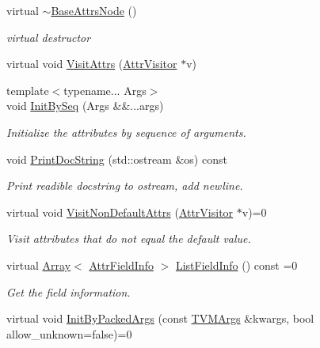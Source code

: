 \begin{DoxyCompactItemize}
\item 
virtual \hyperlink{classtvm_1_1BaseAttrsNode_a225581a40231b2de219da30fced428a2}{$\sim$\+Base\+Attrs\+Node} ()
\begin{DoxyCompactList}\small\item\em virtual destructor \end{DoxyCompactList}\item 
virtual void \hyperlink{classtvm_1_1BaseAttrsNode_af145cd54a0d92705871500a675e43abe}{Visit\+Attrs} (\hyperlink{classtvm_1_1AttrVisitor}{Attr\+Visitor} $\ast$v)
\item 
{\footnotesize template$<$typename... Args$>$ }\\void \hyperlink{classtvm_1_1BaseAttrsNode_aef9e5266d16e163ccc7b1b16c1ea3269}{Init\+By\+Seq} (Args \&\&...args)
\begin{DoxyCompactList}\small\item\em Initialize the attributes by sequence of arguments. \end{DoxyCompactList}\item 
void \hyperlink{classtvm_1_1BaseAttrsNode_a118837841487c80b157dbead88f18513}{Print\+Doc\+String} (std\+::ostream \&os) const 
\begin{DoxyCompactList}\small\item\em Print readible docstring to ostream, add newline. \end{DoxyCompactList}\item 
virtual void \hyperlink{classtvm_1_1BaseAttrsNode_acc8ff84447e3830050d96e2da4188195}{Visit\+Non\+Default\+Attrs} (\hyperlink{classtvm_1_1AttrVisitor}{Attr\+Visitor} $\ast$v)=0
\begin{DoxyCompactList}\small\item\em Visit attributes that do not equal the default value. \end{DoxyCompactList}\item 
virtual \hyperlink{classtvm_1_1Array}{Array}$<$ \hyperlink{classtvm_1_1AttrFieldInfo}{Attr\+Field\+Info} $>$ \hyperlink{classtvm_1_1BaseAttrsNode_a6db664b2fcfb42f967652b596f0cab99}{List\+Field\+Info} () const =0
\begin{DoxyCompactList}\small\item\em Get the field information. \end{DoxyCompactList}\item 
virtual void \hyperlink{classtvm_1_1BaseAttrsNode_a375ef57a9dcf85e7961f91699927e50b}{Init\+By\+Packed\+Args} (const \hyperlink{classtvm_1_1BaseAttrsNode_a257561dad74174cbdc08f6725a45d8ac}{T\+V\+M\+Args} \&kwargs, bool allow\+\_\+unknown=false)=0

\end{DoxyCompactItemize}
